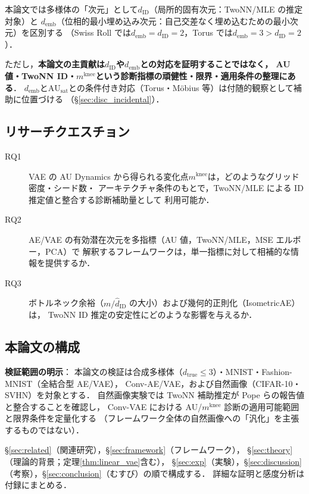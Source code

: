 \documentclass[11pt,a4paper]{jsarticle}
\newcommand{\dID}{d_{\mathrm{ID}}}
\newcommand{\AUsat}{\mathrm{AU}_{\mathrm{sat}}}
\newcommand{\mknee}{m^{\mathrm{knee}}}
\newcommand{\demb}{d_{\mathrm{emb}}}
\begin{document}
本論文では多様体の「次元」として$\dID$（局所的固有次元：TwoNN/MLE の推定対象）と
$\demb$（位相的最小埋め込み次元：自己交差なく埋め込むための最小次元）を区別する
（Swiss Roll では$\demb = \dID = 2$，Torus では$\demb = 3 > \dID = 2$）．

ただし，\textbf{本論文の主貢献は$\dID$や$\demb$との対応を証明することではなく，
AU 値・TwoNN ID・$\mknee$という診断指標の頑健性・限界・適用条件の整理にある}．
$\demb$と$\AUsat$との条件付き対応（Torus・Möbius 等）は付随的観察として補助に位置づける
（§\ref{sec:disc_incidental}）．

\subsection{リサーチクエスチョン}\label{sec:intro_rq}

\begin{description}
  \item[RQ1] VAE の AU Dynamics から得られる変化点$\mknee$は，どのようなグリッド密度・シード数・
             アーキテクチャ条件のもとで，TwoNN/MLE による ID 推定値と整合する診断補助量として
             利用可能か．
  \item[RQ2] AE/VAE の有効潜在次元を多指標（AU 値，TwoNN/MLE，MSE エルボー，PCA）で
             解釈するフレームワークは，単一指標に対して相補的な情報を提供するか．
  \item[RQ3] ボトルネック余裕（$m / \hat{d}_\mathrm{ID}$ の大小）および幾何的正則化（IsometricAE）は，
             TwoNN ID 推定の安定性にどのような影響を与えるか．
\end{description}

\subsection{本論文の構成}\label{sec:intro_structure}

\textbf{検証範囲の明示}：
本論文の検証は合成多様体（$d_{\mathrm{true}} \leq 3$）・MNIST・Fashion-MNIST（全結合型 AE/VAE），
Conv-AE/VAE，および自然画像（CIFAR-10・SVHN）を対象とする．
自然画像実験では TwoNN 補助推定が Pope ら\cite{pope2021intrinsic}の報告値と整合することを確認し，
Conv-VAE における AU/$\mknee$ 診断の適用可能範囲と限界条件を定量化する
（フレームワーク全体の自然画像への「汎化」を主張するものではない）．

§\ref{sec:related}（関連研究），§\ref{sec:framework}（フレームワーク），
§\ref{sec:theory}（理論的背景；定理\ref{thm:linear_vae}含む），
§\ref{sec:exp}（実験），§\ref{sec:discussion}（考察），§\ref{sec:conclusion}（むすび）の順で構成する．
詳細な証明と感度分析は付録にまとめる．
\end{document}

